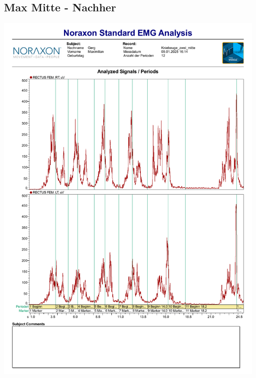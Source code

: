 \subsection*{Max Mitte - Nachher}
\includegraphics[width=.9\textwidth]{img/pdfs/Max_2_mitte.pdf}
\clearpage

